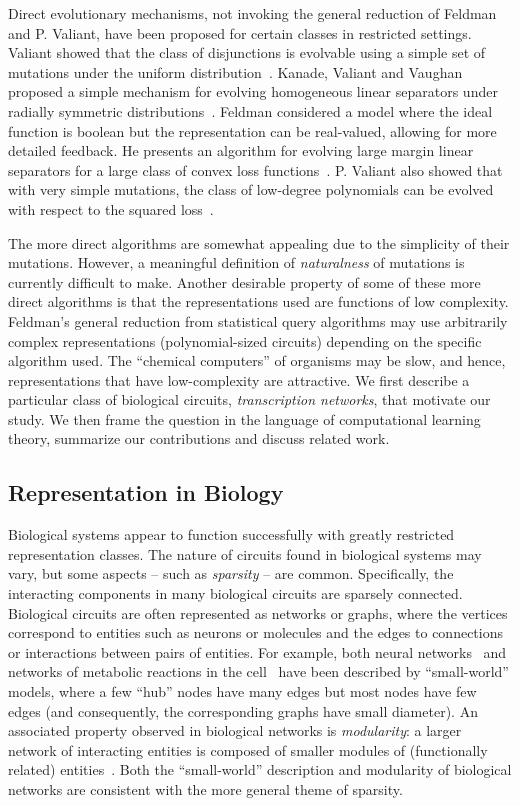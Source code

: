 Direct evolutionary mechanisms, not invoking the general reduction of Feldman
and P. Valiant, have been proposed for certain classes in restricted settings.
Valiant showed that the class of disjunctions is evolvable using a simple set of
mutations under the uniform distribution~\cite{Valiant:2009-evolvability}.
Kanade, Valiant and Vaughan proposed a simple mechanism for evolving homogeneous
linear separators under radially symmetric distributions~\cite{KVV:2010-drift}.
Feldman considered a model where the ideal function is boolean but the
representation can be real-valued, allowing for more detailed feedback. He
presents an algorithm for evolving large margin linear separators for a large
class of convex loss functions~\cite{Feldman:2011-LTF}. P. Valiant also showed
that with very simple mutations, the class of low-degree polynomials can be
evolved with respect to the squared loss~\cite{Valiant:2012-real}.

The more direct algorithms are somewhat appealing due to the simplicity of their
mutations.  However, a meaningful definition of \emph{naturalness} of mutations
is currently difficult to make.
Another desirable property of some of these more direct algorithms is that the
representations used are functions of low complexity. Feldman's general
reduction from statistical query algorithms may use arbitrarily complex
representations (polynomial-sized circuits) depending on the specific algorithm
used. The ``chemical computers'' of organisms may be slow, and hence,
representations that have low-complexity are attractive. We first describe a
particular class of biological circuits, \emph{transcription networks}, that
motivate our study. We then frame the question in the language of computational
learning theory, summarize our contributions and discuss related work.

\subsection{Representation in Biology}

Biological systems appear to function successfully with greatly restricted
representation classes. The nature of circuits found in biological systems may
vary, but some aspects -- such as \emph{sparsity} -- are common.  Specifically,
the interacting components in many biological circuits are sparsely connected.
Biological circuits are often represented as networks or graphs, where the
vertices correspond to entities such as neurons or molecules and the edges to
connections or interactions between pairs of entities. For example, both neural
networks~\cite{Watts:1998} and networks of metabolic reactions in the
cell~\cite{Wagner:2001,Barabasi:2000} have been described by ``small-world''
models, where a few ``hub'' nodes have many edges but most nodes have few edges
(and consequently, the corresponding graphs have small diameter).  An associated
property observed in biological networks is \emph{modularity}: a larger network
of interacting entities is composed of smaller modules of (functionally related)
entities~\cite{Hartwell:1999}.  Both the ``small-world'' description and
modularity of biological networks are consistent with the more general theme of
sparsity.

